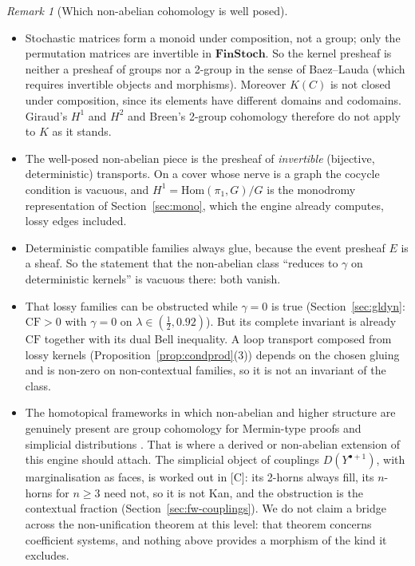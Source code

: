 \documentclass[11pt]{article}
\theoremstyle{definition}
\theoremstyle{remark}
\newtheorem{remark}[theorem]{Remark}
\newcommand{\CF}{\mathrm{CF}}
\newcommand{\src}[1]{\textsf{\small[#1]}}
\begin{document}
\begin{remark}[Which non-abelian cohomology is well posed]\label{rem:nonabelian}
\leavevmode
\begin{itemize}
  \item Stochastic matrices form a monoid under composition, not a group; only the permutation matrices are invertible in $\mathbf{FinStoch}$. So the kernel presheaf is neither a presheaf of groups nor a 2-group in the sense of Baez--Lauda (which requires invertible objects and morphisms). Moreover $K(C)$ is not closed under composition, since its elements have different domains and codomains. Giraud's $H^1$ and $H^2$ \cite{giraud} and Breen's 2-group cohomology \cite{breen} therefore do not apply to $K$ as it stands.
  \item The well-posed non-abelian piece is the presheaf of \emph{invertible} (bijective, deterministic) transports. On a cover whose nerve is a graph the cocycle condition is vacuous, and $H^1=\mathrm{Hom}(\pi_1,G)/G$ is the monodromy representation of Section~\ref{sec:mono}, which the engine already computes, lossy edges included.
  \item Deterministic compatible families always glue, because the event presheaf $E$ is a sheaf. So the statement that the non-abelian class ``reduces to $\gamma$ on deterministic kernels'' is vacuous there: both vanish.
  \item That lossy families can be obstructed while $\gamma=0$ is true (Section~\ref{sec:gldyn}: $\CF>0$ with $\gamma=0$ on $\lambda\in(\tfrac12,0.92)$). But its complete invariant is already $\CF$ together with its dual Bell inequality. A loop transport composed from lossy kernels (Proposition~\ref{prop:condprod}(3)) depends on the chosen gluing and is non-zero on non-contextual families, so it is not an invariant of the class.
  \item The homotopical frameworks in which non-abelian and higher structure are genuinely present are group cohomology for Mermin-type proofs \cite{orbr17} and simplicial distributions \cite{kharoofokay}. That is where a derived or non-abelian extension of this engine should attach. The simplicial object of couplings $D(Y^{\bullet+1})$, with marginalisation as faces, is worked out in \src{C}: its 2-horns always fill, its $n$-horns for $n\ge3$ need not, so it is not Kan, and the obstruction is the contextual fraction (Section~\ref{sec:fw-couplings}). We do not claim a bridge across the non-unification theorem at this level: that theorem concerns coefficient systems, and nothing above provides a morphism of the kind it excludes.
\end{itemize}
\end{remark}
\end{document}
